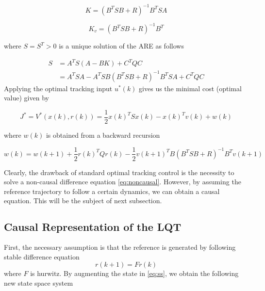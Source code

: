 \begin{equation}
K = (B^TSB + R)^{-1}B^TSA
\end{equation}

\begin{equation}
K_v = (B^TSB + R)^{-1}B^T
\end{equation}

where $S=S^T>0$ is a unique solution of the \ac {ARE} as follows

\begin{equation}
\begin{split}
S &= A^TS(A-BK) + C^TQC \\
&= A^TSA - A^TSB(B^TSB+R)^{-1}B^TSA + C^TQC
\end{split}
\end{equation}
Applying the optimal tracking input $u^*(k)$ gives us the minimal cost (optimal value) given by

\begin{equation}
J^* = V^*(x(k), r(k)) = \frac{1}{2}x(k)^TSx(k) - x(k)^Tv(k) + w(k)
\end{equation}

where $ w(k) $ is obtained from a backward recursion

\begin{equation}
w(k) = w(k+1) + \frac{1}{2}r(k)^TQr(k) - \frac{1}{2}v(k+1)^TB(B^TSB+R)^{-1}B^Tv(k+1)
\end{equation}

Clearly, the drawback of standard optimal tracking control is the necessity to solve a non-causal difference equation \eqref{eq:noncausal}. However, by assuming the reference trajectory to follow a certain dynamics, we can obtain a causal equation. This will be the subject of next subsection.

\subsection{Causal Representation of the LQT}
First, the necessary assumption is that the reference is generated by following stable difference equation
\begin{equation}
r(k+1) = Fr(k) 
\end{equation}
where $ F $ is hurwitz. By augmenting the state in \eqref{eq:ss}, we obtain the following new state space system

